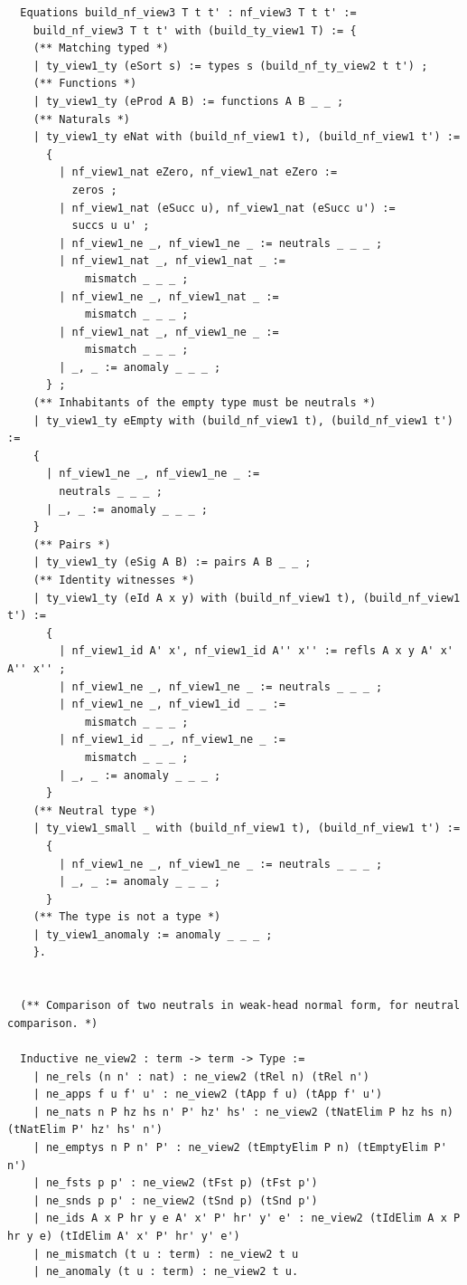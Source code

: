 \begin{lstlisting}
  Equations build_nf_view3 T t t' : nf_view3 T t t' :=
    build_nf_view3 T t t' with (build_ty_view1 T) := {
    (** Matching typed *)
    | ty_view1_ty (eSort s) := types s (build_nf_ty_view2 t t') ;
    (** Functions *)
    | ty_view1_ty (eProd A B) := functions A B _ _ ;
    (** Naturals *)
    | ty_view1_ty eNat with (build_nf_view1 t), (build_nf_view1 t') :=
      {
        | nf_view1_nat eZero, nf_view1_nat eZero :=
          zeros ;
        | nf_view1_nat (eSucc u), nf_view1_nat (eSucc u') :=
          succs u u' ;
        | nf_view1_ne _, nf_view1_ne _ := neutrals _ _ _ ;
        | nf_view1_nat _, nf_view1_nat _ :=
            mismatch _ _ _ ;
        | nf_view1_ne _, nf_view1_nat _ :=
            mismatch _ _ _ ;
        | nf_view1_nat _, nf_view1_ne _ :=
            mismatch _ _ _ ;
        | _, _ := anomaly _ _ _ ;
      } ;
    (** Inhabitants of the empty type must be neutrals *)
    | ty_view1_ty eEmpty with (build_nf_view1 t), (build_nf_view1 t') :=
    {
      | nf_view1_ne _, nf_view1_ne _ := 
        neutrals _ _ _ ;
      | _, _ := anomaly _ _ _ ;
    }
    (** Pairs *)
    | ty_view1_ty (eSig A B) := pairs A B _ _ ;
    (** Identity witnesses *)
    | ty_view1_ty (eId A x y) with (build_nf_view1 t), (build_nf_view1 t') :=
      {
        | nf_view1_id A' x', nf_view1_id A'' x'' := refls A x y A' x' A'' x'' ;
        | nf_view1_ne _, nf_view1_ne _ := neutrals _ _ _ ;
        | nf_view1_ne _, nf_view1_id _ _ :=
            mismatch _ _ _ ;
        | nf_view1_id _ _, nf_view1_ne _ :=
            mismatch _ _ _ ;
        | _, _ := anomaly _ _ _ ;
      }
    (** Neutral type *)
    | ty_view1_small _ with (build_nf_view1 t), (build_nf_view1 t') :=
      {
        | nf_view1_ne _, nf_view1_ne _ := neutrals _ _ _ ;
        | _, _ := anomaly _ _ _ ;
      }
    (** The type is not a type *)
    | ty_view1_anomaly := anomaly _ _ _ ;
    }.


  (** Comparison of two neutrals in weak-head normal form, for neutral comparison. *)

  Inductive ne_view2 : term -> term -> Type :=
    | ne_rels (n n' : nat) : ne_view2 (tRel n) (tRel n')
    | ne_apps f u f' u' : ne_view2 (tApp f u) (tApp f' u')
    | ne_nats n P hz hs n' P' hz' hs' : ne_view2 (tNatElim P hz hs n) (tNatElim P' hz' hs' n')
    | ne_emptys n P n' P' : ne_view2 (tEmptyElim P n) (tEmptyElim P' n')
    | ne_fsts p p' : ne_view2 (tFst p) (tFst p')
    | ne_snds p p' : ne_view2 (tSnd p) (tSnd p')
    | ne_ids A x P hr y e A' x' P' hr' y' e' : ne_view2 (tIdElim A x P hr y e) (tIdElim A' x' P' hr' y' e')
    | ne_mismatch (t u : term) : ne_view2 t u
    | ne_anomaly (t u : term) : ne_view2 t u.


\end{lstlisting}
